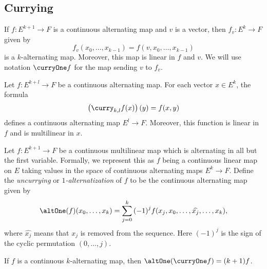 
\subsection{Currying}%
\label{sec:currying}

\begin{definition}%
  \label{def:cont-alt-curry-fin}
  If \(f\colon E^{k + 1} \to F\) is a continuous alternating map and \(v\) is a vector,
  then \(f_{v}\colon E^{k} \to F\) given by
  \[
    f_{v}(x_{0}, \dots, x_{k - 1})=f(v, x_{0}, \dots, x_{k - 1})
  \]
  is a \(k\)-alternating map.
  Moreover, this map is linear in \(f\) and \(v\).
  We will use notation \(\curryOne f\) for the map sending \(v\) to \(f_{v}\).
\end{definition}

\begin{definition}%
  \label{def:cont-alt-curry-fin-add}
  Let \(f\colon E^{k + l} \to F\) be a continuous alternating map.
  For each vector \(x \in E^{k}\), the formula
  \[
    \left(\curry_{k,l} f(x)\right)(y) = f(x, y)
  \]
  defines a continuous alternating map \(E^{l}\to F\).
  Moreover, this function is linear in \(f\) and is multilinear in \(x\).
\end{definition}

\begin{definition}%
  \label{def:alt-one}
  Let \(f\colon E^{k + 1}\to F\) be a continuous multilinear map which is alternating in all but the first variable.
  Formally, we represent this as \(f\) being a continuous linear map on \(E\) taking values in the space of continuous alternating maps \(E^{k}\to F\).
  Define the \emph{uncurrying} or \emph{\(1\)-alternatization} of \(f\) to be the continuous alternating map given by
  \[
    \altOne(f)(x_{0}, \dots, x_{k}) = \sum_{j=0}^{k}{(-1)}^{j}f(x_{j}, x_{0}, \dots, \widehat{x_{j}}, \dots, x_{k}),
  \]
  where \(\widehat{x_{j}}\) means that \(x_{j}\) is removed from the sequence.
  Here \({(-1)}^{j}\) is the sign of the cyclic permutation \((0, \dots, j)\).
\end{definition}

\begin{theorem}%
  \label{thm:uncurry-curry-one}
  If \(f\) is a continuous \(k\)-alternating map, then \(\altOne(\curryOne f) = (k + 1)f\).
\end{theorem}

